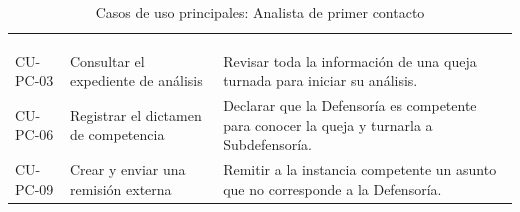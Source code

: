 \small
\renewcommand{\arraystretch}{1.2}
\setlength{\tabcolsep}{4pt}
\begin{longtable}{|L{1.8cm}|L{4.6cm}|L{9.2cm}|}
	\hiderowcolors\caption{Casos de uso principales: Analista de primer contacto}
	\label{tab:cu_pc} \\ \showrowcolors
	\hline
	 &  &  \\
	\hline
	\endfirsthead
	\hline
	 &  &  \\
	\hline
	\endhead
	CU-PC-03 & Consultar el expediente de análisis & Revisar toda la información de una queja turnada para iniciar su análisis. \\ \hline
	CU-PC-06 & Registrar el dictamen de competencia & Declarar que la Defensoría es competente para conocer la queja y turnarla a Subdefensoría. \\ \hline
	CU-PC-09 & Crear y enviar una remisión externa & Remitir a la instancia competente un asunto que no corresponde a la Defensoría. \\ \hline
\end{longtable}
\normalsize
\setlength{\tabcolsep}{6pt}
\renewcommand{\arraystretch}{1}

